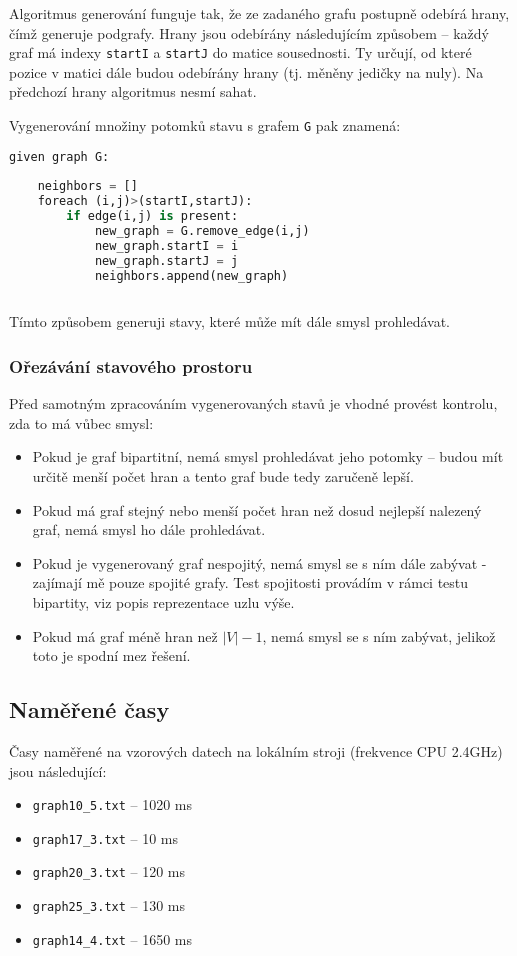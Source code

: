 \documentclass[czech]{article}
\begin{document}
Algoritmus generování funguje tak, že ze zadaného grafu postupně odebírá hrany, čímž generuje podgrafy. Hrany jsou odebírány následujícím způsobem -- každý graf má indexy \texttt{startI} a \texttt{startJ} do matice sousednosti. Ty určují, od které pozice v matici dále budou odebírány hrany (tj. měněny jedičky na nuly). Na předchozí hrany algoritmus nesmí sahat.

Vygenerování množiny potomků stavu s grafem \texttt{G} pak znamená:
\begin{lstlisting}[tabsize=2,language=python]
	given graph G:
	
	neighbors = []
	foreach (i,j)>(startI,startJ):
		if edge(i,j) is present:
			new_graph = G.remove_edge(i,j)
			new_graph.startI = i
			new_graph.startJ = j
			neighbors.append(new_graph)
			
\end{lstlisting}
Tímto způsobem generuji stavy, které může mít dále smysl prohledávat.


\subsubsection{Ořezávání stavového prostoru}
Před samotným zpracováním vygenerovaných stavů je vhodné provést kontrolu, zda to má vůbec smysl:
\begin{itemize}
	\item Pokud je graf bipartitní, nemá smysl prohledávat jeho potomky -- budou mít určitě menší počet hran a tento graf bude tedy zaručeně lepší.
	\item Pokud má graf stejný nebo menší počet hran než dosud nejlepší nalezený graf, nemá smysl ho dále prohledávat.
	\item Pokud je vygenerovaný graf nespojitý, nemá smysl se s ním dále zabývat - zajímají mě pouze spojité grafy. Test spojitosti provádím v rámci testu bipartity, viz popis reprezentace uzlu výše.
	\item Pokud má graf méně hran než $|V|-1$, nemá smysl se s ním zabývat, jelikož toto je spodní mez řešení.
\end{itemize}

\subsection{Naměřené časy}
Časy naměřené na vzorových datech na lokálním stroji (frekvence CPU 2.4GHz) jsou následující:

\begin{itemize}
	\item \texttt{graph10\_5.txt} -- 1020 ms
	\item \texttt{graph17\_3.txt} -- 10 ms
	\item \texttt{graph20\_3.txt} -- 120 ms
	\item \texttt{graph25\_3.txt} -- 130 ms
	\item \texttt{graph14\_4.txt} -- 1650 ms
\end{itemize}
\end{document}
